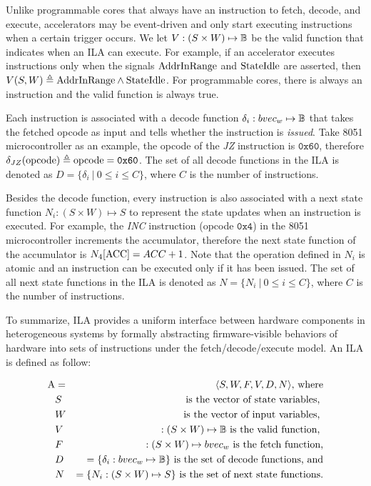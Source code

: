 Unlike programmable cores that always have an instruction to fetch, decode, and
execute, accelerators may be event-driven and only start executing instructions 
when a certain trigger occurs. 
We let $V : (S \times W) \mapsto \mathbb{B}$ be the valid function that indicates when 
an ILA can execute.
%
For example, if an accelerator executes instructions only when the signals 
$\mathrm{AddrInRange}$ and $\mathrm{StateIdle}$ are asserted, then 
$V(S, W) \triangleq \mathrm{AddrInRange} \wedge \mathrm{StateIdle}$.
For programmable cores, there is always an instruction and the valid function 
is always true.

Each instruction is associated with a decode function 
$\delta_i : bvec_w \mapsto \mathbb{B}$ that takes the fetched opcode as input and 
tells whether the instruction is \textit{issued}.
Take 8051 microcontroller as an example, the opcode of the \textit{JZ} 
instruction is $\texttt{0x60}$, therefore 
$\delta_{JZ} (\mathrm{opcode}) \triangleq \mathrm{opcode} = \texttt{0x60}$.
The set of all decode functions in the ILA is denoted as 
$D = \{ \delta_i ~|~ 0 \leq i \leq C \}$, where $C$ is the number of 
instructions.

Besides the decode function, every instruction is also associated with a 
next state function $N_i : (S \times W) \mapsto S$ to represent the state updates 
when an instruction is executed.
For example, the \textit{INC} instruction (opcode $\texttt{0x4}$) in the 8051 
microcontroller increments the accumulator, therefore the next state function 
of the accumulator is $N_4[\mathrm{ACC}] = ACC + 1$. 
Note that the operation defined in $N_i$ is atomic and an instruction can be 
executed only if it has been issued.
The set of all next state functions in the ILA is denoted as 
$N = \{ N_i ~|~ 0 \leq i \leq C \}$, where $C$ is the number of instructions.

To summarize, ILA provides a uniform interface between hardware components 
in heterogeneous systems by formally abstracting firmware-visible behaviors of 
hardware into sets of instructions under the fetch/decode/execute model. 
An ILA is defined as follow:

\begin{eqnarray}
  \mathrm{A} &=& \langle S, W, F, V, D, N \rangle \text{, where} \nonumber \\
      &S& \text{ is the vector of state variables, } \nonumber \\
      &W& \text{ is the vector of input variables, } \nonumber \\
      &V& :(S\times W) \mapsto \mathbb{B} \text{ is the valid function, } \nonumber \\
      &F& :(S\times W) \mapsto bvec_w \text{ is the fetch function,} \nonumber \\
      &D& = \{ \delta_i : bvec_w \mapsto \mathbb{B} \} 
            \text{ is the set of decode functions, and} \nonumber \\
      &N& = \{ N_i : (S \times W) \mapsto S \} 
            \text{ is the set of next state functions.} \nonumber
\end{eqnarray}

